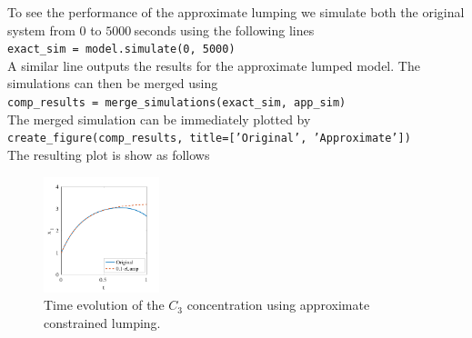 To see the performance of the approximate lumping we simulate both the original system from 0 to $5000~$seconds using the following lines \\
\texttt{exact_sim = model.simulate(0, 5000)}\\
A similar line outputs the results for the approximate lumped model. 
The simulations can then be merged using \\
\texttt{comp_results = merge_simulations(exact_sim, app_sim)}\\
The merged simulation can be immediately plotted by \\
\texttt{create_figure(comp_results, title=['Original', 'Approximate'])}\\
The resulting plot is show as follows
\begin{figure}
    \centering
    \includegraphics[width=0.3\textwidth]{img/examplecalc.pdf}
    \caption{
    Time evolution of the $C_3$ concentration using approximate constrained lumping.}
\end{figure}








